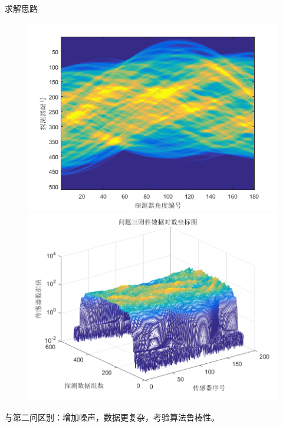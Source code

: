\documentclass{beamer} %
\begin{document}
\begin{frame}{求解思路}
   \begin{figure}[H]
		\begin{minipage}[H]{0.45\textwidth}
		\centering
		\includegraphics[width=\textwidth]{./pic/fujian5_2.png}
		\end{minipage}
		\begin{minipage}[H]{0.5\textwidth}
		\centering
		\includegraphics[width=\textwidth]{./pic/fujian5.png}
		\end{minipage}
	\end{figure}
	与第二问区别：增加噪声，数据更复杂，考验算法鲁棒性。
\end{frame}
  
\end{document}
